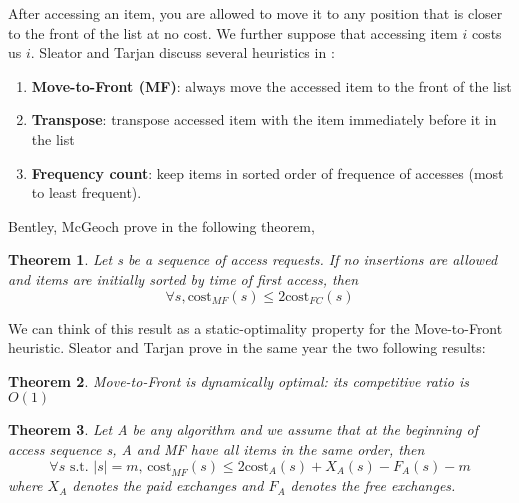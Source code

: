\documentclass[11pt]{article}
\newtheorem{theorem}{Theorem}
\begin{document}
After accessing an item, you are allowed to move it to any position that is closer to the front of the list at no cost. We further suppose that accessing item $i$ costs us $i$. Sleator and Tarjan discuss several heuristics in \cite{SJ85}:
\begin{enumerate}
\item {\bf Move-to-Front (MF)}: always move the accessed item to the front of the list
\item {\bf Transpose}: transpose accessed item with the item immediately before it in the list
\item {\bf Frequency count}: keep items in sorted order of frequence of accesses (most to least frequent).
\end{enumerate}
Bentley, McGeoch prove in \cite{BM85} the following theorem,

\begin{theorem}
Let s be a sequence of access requests. If no insertions are allowed and items are initially sorted by time of first access, then
$$\forall s, \text{cost}_{MF}(s) \leq 2 \text{cost}_{FC}(s)$$
\end{theorem}

We can think of this result as a static-optimality property for the Move-to-Front heuristic. Sleator and Tarjan \cite{SJ85} prove in the same year the two following results:

\begin{theorem}
Move-to-Front is dynamically optimal: its competitive ratio is $O(1)$
\end{theorem}

\begin{theorem}
Let A be any algorithm and we assume that at the beginning of access sequence s, A and MF have all items in the same order, then $$\forall s \text{ s.t. } |s| = m \text{, cost}_{MF}(s) \leq  2 \text{cost}_A(s) + X_{A}(s) - F_{A}(s) -m$$ where $X_A$ denotes the paid exchanges and $F_A$ denotes the free exchanges.
\end{theorem}
\end{document}
